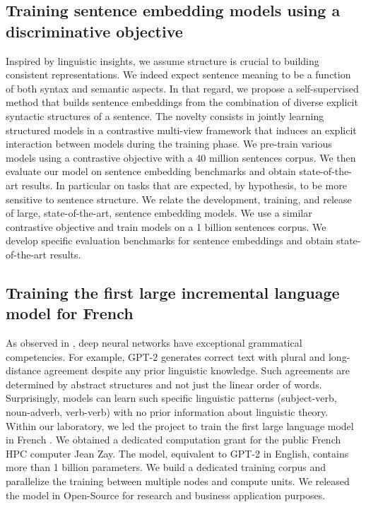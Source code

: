 \subsection{Training sentence embedding models using a discriminative objective}

Inspired by linguistic insights, we assume structure is crucial to building consistent representations. We indeed expect sentence meaning to be a function of both syntax and semantic aspects. In that regard, we propose a self-supervised method that builds sentence embeddings from the combination of diverse explicit syntactic structures of a sentence. The novelty consists in jointly learning structured models in a contrastive multi-view framework that induces an explicit interaction between models during the training phase. We pre-train various models using a contrastive objective with a 40 million sentences corpus. We then evaluate our model on sentence embedding benchmarks and obtain state-of-the-art results. In particular on tasks that are expected, by hypothesis, to be more sensitive to sentence structure. We relate the development, training, and release of large, state-of-the-art, sentence embedding models. We use a similar contrastive objective and train models on a 1 billion sentences corpus. We develop specific evaluation benchmarks for sentence embeddings and obtain state-of-the-art results.

\subsection{Training the first large incremental language model for French}

As observed in \textcite{linzen_2020}, deep neural networks have exceptional grammatical competencies. For example, GPT-2 generates correct text with plural and long-distance agreement despite any prior linguistic knowledge. Such agreements are determined by abstract structures and not just the linear order of words. Surprisingly, models can learn such specific linguistic patterns (subject-verb, noun-adverb, verb-verb) with no prior information about linguistic theory. Within our laboratory, we led the project to train the first large language model in French \parencite{simoulin_2021c}. We obtained a dedicated computation grant for the public French HPC computer Jean Zay. The model, equivalent to GPT-2 in English, contains more than 1 billion parameters. We build a dedicated training corpus and parallelize the training between multiple nodes and compute units. We released the model in Open-Source for research and business application purposes. 

